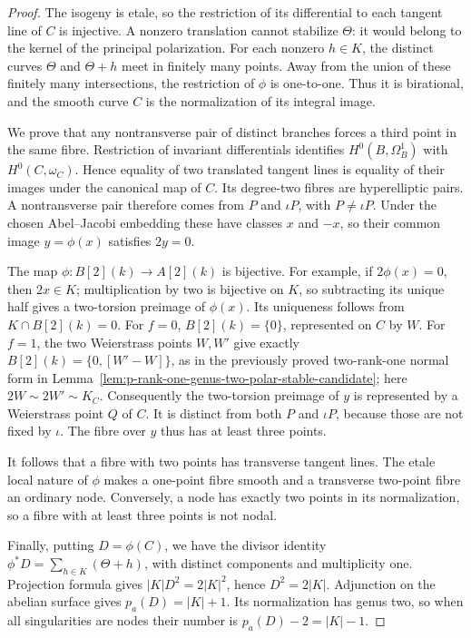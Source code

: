 \begin{proof}
The isogeny is etale, so the restriction of its differential to
each tangent line of $C$ is injective. A nonzero translation cannot
stabilize $\Theta$: it would belong to the kernel of the principal
polarization. For each nonzero $h\in K$, the distinct curves
$\Theta$ and $\Theta+h$ meet in finitely many points. Away from
the union of these finitely many intersections, the restriction
of $\phi$ is one-to-one. Thus it is birational, and the smooth
curve $C$ is the normalization of its integral image.

We prove that any nontransverse pair of distinct branches forces
a third point in the same fibre. Restriction of invariant
differentials identifies
$H^0(B,\Omega_B^1)$ with $H^0(C,\omega_C)$. Hence equality of
two translated tangent lines is equality of their images under
the canonical map of $C$. Its degree-two fibres are hyperelliptic
pairs. A nontransverse pair therefore comes from $P$ and
$\iota P$, with $P\ne\iota P$.
Under the chosen Abel--Jacobi embedding these have classes $x$
and $-x$, so their common image $y=\phi(x)$ satisfies $2y=0$.

The map $\phi:B[2](k)\to A[2](k)$ is bijective. For example,
if $2\phi(x)=0$, then $2x\in K$; multiplication by two is
bijective on $K$, so subtracting its unique half gives a
two-torsion preimage of $\phi(x)$. Its uniqueness follows from
$K\cap B[2](k)=0$.
For $f=0$, $B[2](k)=\{0\}$, represented on $C$ by $W$.
For $f=1$, the two Weierstrass points $W,W'$ give exactly
$B[2](k)=\{0,[W'-W]\}$, as in the previously proved
two-rank-one normal form in Lemma~\ref{lem:p-rank-one-genus-two-polar-stable-candidate}; here $2W\sim2W'\sim K_C$.
Consequently the two-torsion preimage of $y$ is represented
by a Weierstrass point $Q$ of $C$. It is distinct from both
$P$ and $\iota P$, because those are not fixed by $\iota$.
The fibre over $y$ thus has at least three points.

It follows that a fibre with two points has transverse tangent
lines. The etale local nature of $\phi$ makes a one-point fibre
smooth and a transverse two-point fibre an ordinary node.
Conversely, a node has exactly two points in its normalization,
so a fibre with at least three points is not nodal.

Finally, putting $D=\phi(C)$, we have the divisor identity
$\phi^*D=\sum_{h\in K}(\Theta+h)$, with distinct components
and multiplicity one. Projection formula gives
$|K|D^2=2|K|^2$, hence $D^2=2|K|$.
Adjunction on the abelian surface gives $p_a(D)=|K|+1$.
Its normalization has genus two, so when all singularities
are nodes their number is $p_a(D)-2=|K|-1$.
\end{proof}

